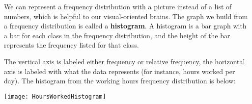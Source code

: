 We can represent a frequency distribution with a picture instead of a list of numbers, which is helpful to our visual-oriented brains.  The graph we build from a frequency distribution is called a \textbf{histogram}.  A histogram is a bar graph with a bar for each class in the frequency distribution, and the height of the bar represents the frequency listed for that class.

The vertical axis is labeled either frequency or relative frequency, the horizontal axis is labeled with what the data represents (for instance, hours worked per day). The histogram from the working hours frequency distribution is below: 

\begin{center}
\texttt{[image: HoursWorkedHistogram]}
\end{center}

